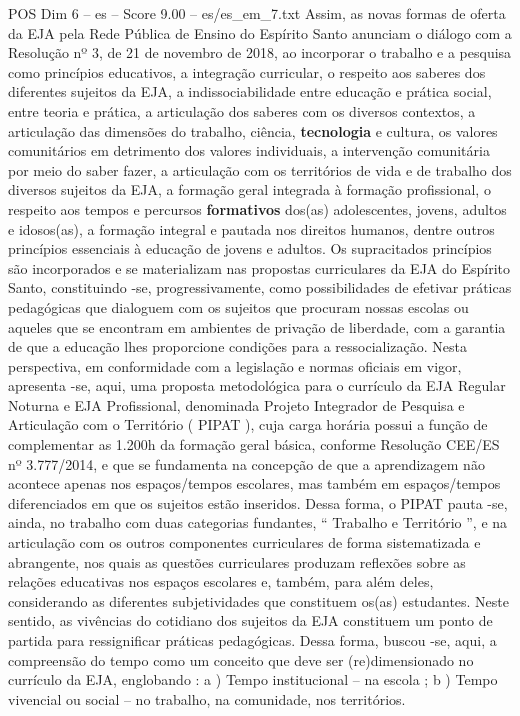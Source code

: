 \begin{textsample}{POS Dim 6 – es – Score 9.00 – es/es\_em\_7.txt}
Assim, as novas formas de oferta da EJA pela Rede Pública de Ensino do Espírito Santo anunciam o diálogo com a Resolução nº 3, de 21 de novembro de 2018, ao incorporar o trabalho e a pesquisa como princípios educativos, a integração curricular, o respeito aos saberes dos diferentes sujeitos da EJA, a indissociabilidade entre educação e prática social, entre teoria e prática, a articulação dos saberes com os diversos contextos, a articulação das dimensões do trabalho, ciência, \textbf{tecnologia} e cultura, os valores comunitários em detrimento dos valores individuais, a intervenção comunitária por meio do saber fazer, a articulação com os territórios de vida e de trabalho dos diversos sujeitos da EJA, a formação geral integrada à formação profissional, o respeito aos tempos e percursos \textbf{formativos} dos(as) adolescentes, jovens, adultos e idosos(as), a formação integral e pautada nos direitos humanos, dentre outros princípios essenciais à educação de jovens e adultos.
Os supracitados princípios são incorporados e se materializam nas propostas curriculares da EJA do Espírito Santo, constituindo -se, progressivamente, como possibilidades de efetivar práticas pedagógicas que dialoguem com os sujeitos que procuram nossas escolas ou aqueles que se encontram em ambientes de privação de liberdade, com a garantia de que a educação lhes proporcione condições para a ressocialização.
Nesta perspectiva, em conformidade com a legislação e normas oficiais em vigor, apresenta -se, aqui, uma proposta metodológica para o currículo da EJA Regular Noturna e EJA Profissional, denominada Projeto Integrador de Pesquisa e Articulação com o Território ( PIPAT ), cuja carga horária possui a função de complementar as 1.200h da formação geral básica, conforme Resolução CEE/ES nº 3.777/2014, e que se fundamenta na concepção de que a aprendizagem não acontece apenas nos espaços/tempos escolares, mas também em espaços/tempos diferenciados em que os sujeitos estão inseridos.
Dessa forma, o PIPAT pauta -se, ainda, no trabalho com duas categorias fundantes, “ Trabalho e Território ”, e na articulação com os outros componentes curriculares de forma sistematizada e abrangente, nos quais as questões curriculares produzam reflexões sobre as relações educativas nos espaços escolares e, também, para além deles, considerando as diferentes subjetividades que constituem os(as) estudantes.
Neste sentido, as vivências do cotidiano dos sujeitos da EJA constituem um ponto de partida para ressignificar práticas pedagógicas.
Dessa forma, buscou -se, aqui, a compreensão do tempo como um conceito que deve ser (re)dimensionado no currículo da EJA, englobando : a ) Tempo institucional – na escola ; b ) Tempo vivencial ou social – no trabalho, na comunidade, nos territórios.

\end{textsample}
